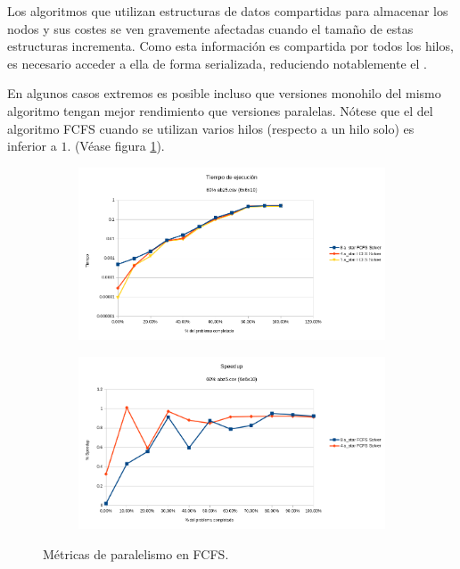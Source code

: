 Los algoritmos que utilizan estructuras de datos compartidas
para almacenar los nodos y sus costes se ven gravemente
afectadas cuando el tamaño de estas estructuras incrementa.
Como esta información es compartida por todos los hilos,
es necesario acceder a ella de forma serializada,
reduciendo notablemente el .

En algunos casos extremos es posible incluso
que versiones monohilo del mismo algoritmo
tengan mejor rendimiento que versiones paralelas.
Nótese que el  del algoritmo FCFS
cuando se utilizan varios hilos (respecto a un hilo solo)
es inferior a $1$.
(Véase figura \ref{fig:SpeedupFCFS}).

\begin{figure}[h]
    \begin{subfigure}{.5\textwidth}
        \begin{center}
            \includegraphics[width=\textwidth]{Media/Ch2/Runtime_FCFS_Log.png}
        \end{center}
    \end{subfigure}
    \begin{subfigure}{.5\textwidth}
        \begin{center}
            \includegraphics[width=\textwidth]{Media/Ch2/Speedup_FCFS.png}
            \label{fig:SpeedupFCFS}
        \end{center}
    \end{subfigure}
    \caption{Métricas de paralelismo en FCFS.}
    \label{fig:ParalelismoFCFS}
\end{figure}

